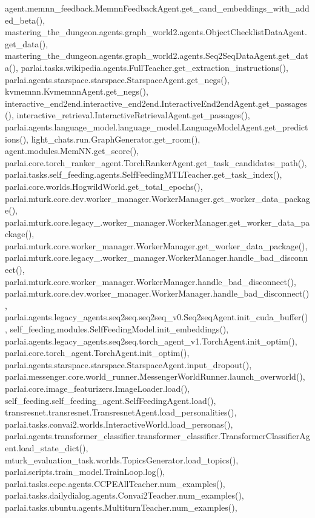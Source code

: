 agent.\+memnn\+\_\+feedback.\+Memnn\+Feedback\+Agent.\+get\+\_\+cand\+\_\+embeddings\+\_\+with\+\_\+added\+\_\+beta(), mastering\+\_\+the\+\_\+dungeon.\+agents.\+graph\+\_\+world2.\+agents.\+Object\+Checklist\+Data\+Agent.\+get\+\_\+data(), mastering\+\_\+the\+\_\+dungeon.\+agents.\+graph\+\_\+world2.\+agents.\+Seq2\+Seq\+Data\+Agent.\+get\+\_\+data(), parlai.\+tasks.\+wikipedia.\+agents.\+Full\+Teacher.\+get\+\_\+extraction\+\_\+instructions(), parlai.\+agents.\+starspace.\+starspace.\+Starspace\+Agent.\+get\+\_\+negs(), kvmemnn.\+Kvmemnn\+Agent.\+get\+\_\+negs(), interactive\+\_\+end2end.\+interactive\+\_\+end2end.\+Interactive\+End2end\+Agent.\+get\+\_\+passages(), interactive\+\_\+retrieval.\+Interactive\+Retrieval\+Agent.\+get\+\_\+passages(), parlai.\+agents.\+language\+\_\+model.\+language\+\_\+model.\+Language\+Model\+Agent.\+get\+\_\+predictions(), light\+\_\+chats.\+run.\+Graph\+Generator.\+get\+\_\+room(), agent.\+modules.\+Mem\+N\+N.\+get\+\_\+score(), parlai.\+core.\+torch\+\_\+ranker\+\_\+agent.\+Torch\+Ranker\+Agent.\+get\+\_\+task\+\_\+candidates\+\_\+path(), parlai.\+tasks.\+self\+\_\+feeding.\+agents.\+Self\+Feeding\+M\+T\+L\+Teacher.\+get\+\_\+task\+\_\+index(), parlai.\+core.\+worlds.\+Hogwild\+World.\+get\+\_\+total\+\_\+epochs(), parlai.\+mturk.\+core.\+dev.\+worker\+\_\+manager.\+Worker\+Manager.\+get\+\_\+worker\+\_\+data\+\_\+package(), parlai.\+mturk.\+core.\+legacy\+\_.\+worker\+\_\+manager.\+Worker\+Manager.\+get\+\_\+worker\+\_\+data\+\_\+package(), parlai.\+mturk.\+core.\+worker\+\_\+manager.\+Worker\+Manager.\+get\+\_\+worker\+\_\+data\+\_\+package(), parlai.\+mturk.\+core.\+legacy\+\_.\+worker\+\_\+manager.\+Worker\+Manager.\+handle\+\_\+bad\+\_\+disconnect(), parlai.\+mturk.\+core.\+worker\+\_\+manager.\+Worker\+Manager.\+handle\+\_\+bad\+\_\+disconnect(), parlai.\+mturk.\+core.\+dev.\+worker\+\_\+manager.\+Worker\+Manager.\+handle\+\_\+bad\+\_\+disconnect(), parlai.\+agents.\+legacy\+\_\+agents.\+seq2seq.\+seq2seq\+\_\+v0.\+Seq2seq\+Agent.\+init\+\_\+cuda\+\_\+buffer(), self\+\_\+feeding.\+modules.\+Self\+Feeding\+Model.\+init\+\_\+embeddings(), parlai.\+agents.\+legacy\+\_\+agents.\+seq2seq.\+torch\+\_\+agent\+\_\+v1.\+Torch\+Agent.\+init\+\_\+optim(), parlai.\+core.\+torch\+\_\+agent.\+Torch\+Agent.\+init\+\_\+optim(), parlai.\+agents.\+starspace.\+starspace.\+Starspace\+Agent.\+input\+\_\+dropout(), parlai.\+messenger.\+core.\+world\+\_\+runner.\+Messenger\+World\+Runner.\+launch\+\_\+overworld(), parlai.\+core.\+image\+\_\+featurizers.\+Image\+Loader.\+load(), self\+\_\+feeding.\+self\+\_\+feeding\+\_\+agent.\+Self\+Feeding\+Agent.\+load(), transresnet.\+transresnet.\+Transresnet\+Agent.\+load\+\_\+personalities(), parlai.\+tasks.\+convai2.\+worlds.\+Interactive\+World.\+load\+\_\+personas(), parlai.\+agents.\+transformer\+\_\+classifier.\+transformer\+\_\+classifier.\+Transformer\+Classifier\+Agent.\+load\+\_\+state\+\_\+dict(), mturk\+\_\+evaluation\+\_\+task.\+worlds.\+Topics\+Generator.\+load\+\_\+topics(), parlai.\+scripts.\+train\+\_\+model.\+Train\+Loop.\+log(), parlai.\+tasks.\+ccpe.\+agents.\+C\+C\+P\+E\+All\+Teacher.\+num\+\_\+examples(), parlai.\+tasks.\+dailydialog.\+agents.\+Convai2\+Teacher.\+num\+\_\+examples(), parlai.\+tasks.\+ubuntu.\+agents.\+Multiturn\+Teacher.\+num\+\_\+examples(), 